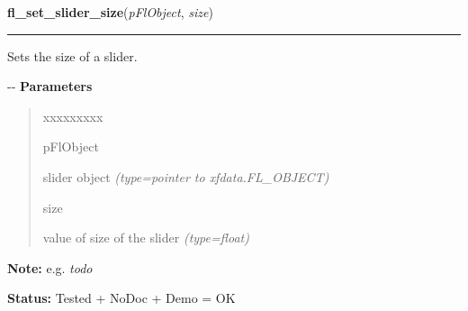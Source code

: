 \hspace{.8\funcindent}\begin{boxedminipage}{\funcwidth}

    \raggedright \textbf{fl\_set\_slider\_size}(\textit{pFlObject}, \textit{size})

    \vspace{-1.5ex}

    \rule{\textwidth}{0.5\fboxrule}
\setlength{\parskip}{2ex}

Sets the size of a slider.

-{}-
\setlength{\parskip}{1ex}
      \textbf{Parameters}
      \vspace{-1ex}

      \begin{quote}
        \begin{Ventry}{xxxxxxxxx}

          \item[pFlObject]


slider object
            {\it (type=pointer to xfdata.FL\_OBJECT)}

          \item[size]


value of size of the slider
            {\it (type=float)}

        \end{Ventry}

      \end{quote}

\textbf{Note:} 
e.g. \emph{todo}


\textbf{Status:} 
Tested + NoDoc + Demo = OK


    \end{boxedminipage}

    \label{xformslib:flslider:fl_set_slider_precision}

    \vspace{0.5ex}

